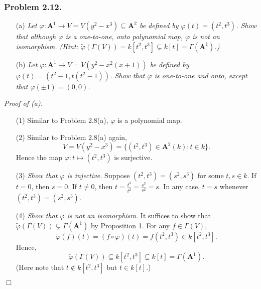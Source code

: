 \documentclass{article}
\begin{document}



\subsubsection*{Problem 2.12.}
\begin{enumerate}
\item[(a)]
  \emph{Let $\varphi: \mathbf{A}^{1} \to V = V(y^2-x^3) \subseteq \mathbf{A}^{2}$
  be defined by $\varphi(t) = (t^2, t^3)$.
  Show that although $\varphi$ is a one-to-one, onto polynomial map,
  $\varphi$ is not an isomorphism.
  (Hint: $\widetilde{\varphi}(\Gamma(V)) = k[t^2,t^3] \subsetneq k[t] = \Gamma(\mathbf{A}^{1})$.)}

\item[(b)]
  \emph{Let $\varphi: \mathbf{A}^{1} \to V = V(y^2 - x^2(x+1))$
  be defined by $\varphi(t) = (t^2-1, t(t^2-1))$.
  Show that $\varphi$ is one-to-one and onto, except that $\varphi(\pm 1) = (0, 0)$.} \\
\end{enumerate}



\emph{Proof of (a).}
\begin{enumerate}
\item[(1)]
  Similar to Problem 2.8(a), $\varphi$ is a polynomial map.

\item[(2)]
  Similar to Problem 2.8(a) again,
  \[
    V = V(y^2-x^3) = \{ (t^2,t^3) \in \mathbf{A}^2(k) : t \in k \}.
  \]
  Hence the map $\varphi: t \mapsto (t^2, t^3)$ is surjective.

\item[(3)]
  \emph{Show that $\varphi$ is injective.}
  Suppose $(t^2, t^3) = (s^2, s^3)$ for some $t, s \in k$.
  If $t = 0$, then $s = 0$.
  If $t \neq 0$, then $t = \frac{t^3}{t^2} = \frac{s^3}{s^2} = s$.
  In any case, $t = s$ whenever $(t^2, t^3) = (s^2, s^3)$.

\item[(4)]
  \emph{Show that $\varphi$ is not an isomorphism.}
  It suffices to show that $\widetilde{\varphi}(\Gamma(V)) \subsetneq \Gamma(\mathbf{A}^{1})$
  by Proposition 1.
  For any $f \in \Gamma(V)$,
  \[
    \widetilde{\varphi}(f)(t) = (f \circ \varphi)(t) = f(t^2,t^3) \in k[t^2,t^3].
  \]
  Hence,
  \[
    \widetilde{\varphi}(\Gamma(V)) \subseteq k[t^2,t^3] \subsetneq k[t] = \Gamma(\mathbf{A}^{1}).
  \]
  (Here note that $t \not\in k[t^2,t^3]$ but $t \in k[t]$.)
\end{enumerate}
$\Box$ \\
\end{document}
